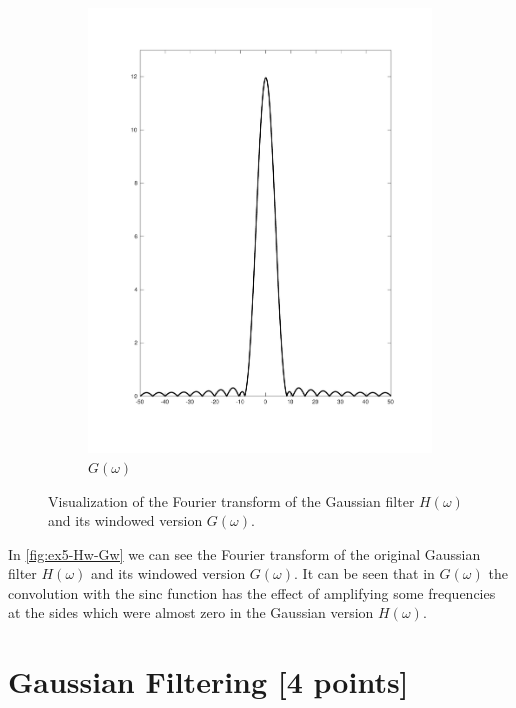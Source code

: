 \documentclass[tikz,14pt,fleqn]{article}
\newcommand{\FIXME}[1]{{\color{FIXMECOLOR}{\textbf{FIXME: #1}}}}
\begin{document}
\begin{figure}[H]
\begin{subfigure}{0.49\linewidth}
        \includegraphics[width=\linewidth]{fig/5.gw.pdf}
        \caption{$G(\omega)$}
        \label{fig:ex5-Gw}
    \end{subfigure}
    \caption{Visualization of the Fourier transform of the Gaussian filter $H(\omega)$ and its windowed version $G(\omega)$.}
    \label{fig:ex5-Hw-Gw}
\end{figure}

\FIXME{plots}

In \autoref{fig:ex5-Hw-Gw} we can see the Fourier transform of the original Gaussian filter $H(\omega)$ and its windowed version $G(\omega)$. It can be seen that in $G(\omega)$ the convolution with the sinc function has the effect of amplifying some frequencies at the sides which were almost zero in the Gaussian version $H(\omega)$.


\section{Gaussian Filtering [4 points]}
\end{document}
